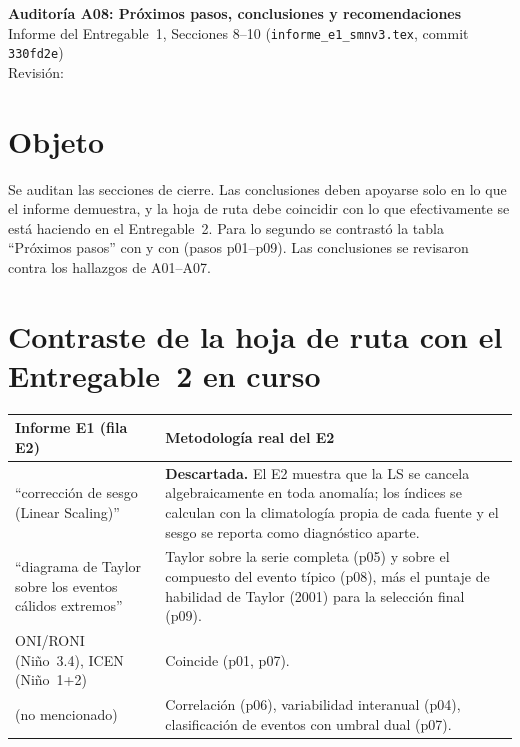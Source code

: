 \newcommand{\auditoriaid}{A08 -- Próximos pasos, conclusiones y recomendaciones}



\begin{center}
{\Large\bfseries Auditoría A08: Próximos pasos, conclusiones y recomendaciones}\\[0.4em]
{\normalsize Informe del Entregable~1, Secciones 8--10 (\texttt{informe\_e1\_smnv3.tex}, commit \texttt{330fd2e})}\\[0.2em]
{\small Revisión: \fechaentrega}
\end{center}

\section{Objeto}

Se auditan las secciones de cierre. Las conclusiones deben apoyarse solo en lo que el informe demuestra, y la hoja de ruta debe coincidir con lo que efectivamente se está haciendo en el Entregable~2. Para lo segundo se contrastó la tabla ``Próximos pasos'' con  y con  (pasos p01--p09). Las conclusiones se revisaron contra los hallazgos de A01--A07.

\section{Contraste de la hoja de ruta con el Entregable~2 en curso}

\begin{center}\small
\begin{tabular}{@{}L{5.2cm}L{\dimexpr\textwidth-5.2cm-2\tabcolsep\relax}@{}}
\toprule
Informe E1 (fila E2) & Metodología real del E2 \\
\midrule
``corrección de sesgo (Linear Scaling)'' & \textbf{Descartada.} El E2 muestra que la LS se cancela algebraicamente en toda anomalía; los índices se calculan con la climatología propia de cada fuente y el sesgo se reporta como diagnóstico aparte. \\
``diagrama de Taylor sobre los eventos cálidos extremos'' & Taylor sobre la serie completa (p05) y sobre el compuesto del evento típico (p08), más el puntaje de habilidad de Taylor (2001) para la selección final (p09). \\
ONI/RONI (Niño~3.4), ICEN (Niño~1+2) & Coincide (p01, p07). \\
(no mencionado) & Correlación (p06), variabilidad interanual (p04), clasificación de eventos con umbral dual (p07). \\
\bottomrule
\end{tabular}
\end{center}

